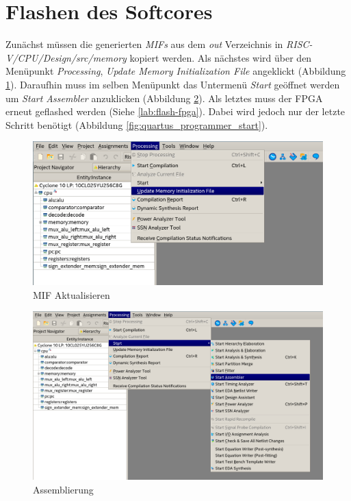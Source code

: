     \section{Flashen des Softcores}

        Zunächst müssen die generierten \textit{MIFs} aus dem \textit{out} Verzeichnis in
        \textit{RISC-V/CPU/Design/src/memory} kopiert werden.
        Als nächstes wird über den Menüpunkt \textit{Processing},
        \textit{Update Memory Initialization File} angeklickt (Abbildung \ref{fig:update-mif}).
        Daraufhin muss im selben Menüpunkt das Untermenü \textit{Start} geöffnet werden um
        \textit{Start Assembler} anzuklicken (Abbildung \ref{fig:start-asm}).
        Als letztes muss der FPGA erneut geflashed werden (Siehe \ref{lab:flash-fpga}).
        Dabei wird jedoch nur der letzte Schritt benötigt (Abbildung \ref{fig:quartus_programmer_start}).


        \begin{figure}[H]
            \centering
            \includegraphics[scale=0.6]{img/update_mif.png}
            \caption{MIF Aktualisieren}
            \label{fig:update-mif}
        \end{figure}

        \begin{figure}[H]
            \centering
            \includegraphics[scale=0.5]{img/start_assembler.png}
            \caption{Assemblierung}
            \label{fig:start-asm}
        \end{figure}

